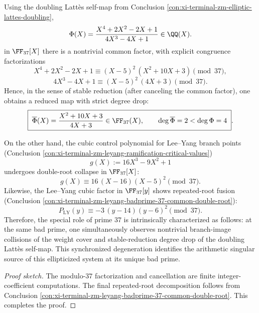 \begin{conclusion}\label{con:xi-terminal-zm-elliptic-lattes-badprime-37-degree-drop}
Using the doubling Latt\`es self-map from Conclusion \ref{con:xi-terminal-zm-elliptic-lattes-doubling},
\[
\Phi(X)=\frac{X^4+2X^2-2X+1}{4X^3-4X+1}\in\QQ(X).
\]
in \(\FF_{37}[X]\) there is a nontrivial common factor, with explicit congruence factorizations
\[
X^4+2X^2-2X+1\equiv (X-5)^2\,(X^2+10X+3)\pmod{37},
\]
\[
4X^3-4X+1\equiv (X-5)^2\,(4X+3)\pmod{37}.
\]
Hence, in the sense of stable reduction (after canceling the common factor), one obtains a reduced map with strict degree drop:
\[
\boxed{\;
\overline{\Phi}(X)=\frac{X^2+10X+3}{4X+3}\in\FF_{37}(X),\qquad \deg\overline{\Phi}=2<\deg\Phi=4\; } .
\]
\par
On the other hand, the cubic control polynomial for Lee--Yang branch points (Conclusion \ref{con:xi-terminal-zm-leyang-ramification-critical-values})
\[
g(X):=16X^3-9X^2+1
\]
undergoes double-root collapse in \(\FF_{37}[X]\):
\[
g(X)\equiv 16\,(X-16)(X-5)^2\pmod{37}.
\]
Likewise, the Lee--Yang cubic factor in \(\FF_{37}[y]\) shows repeated-root fusion (Conclusion \ref{con:xi-terminal-zm-leyang-badprime-37-common-double-root}):
\[
P_{\mathrm{LY}}(y)\equiv -3\,(y-14)(y-6)^2\pmod{37}.
\]
Therefore, the special role of prime \(37\) is intrinsically characterized as follows: at the same bad prime, one simultaneously observes nontrivial branch-image collisions of the weight cover and stable-reduction degree drop of the doubling Latt\`es self-map.
This synchronized degeneration identifies the arithmetic singular source of this ellipticized system at its unique bad prime.
\end{conclusion}
\begin{proof}[Proof sketch]
The modulo-\(37\) factorization and cancellation are finite integer-coefficient computations.
The final repeated-root decomposition follows from Conclusion \ref{con:xi-terminal-zm-leyang-badprime-37-common-double-root}. This completes the proof.
\end{proof}


